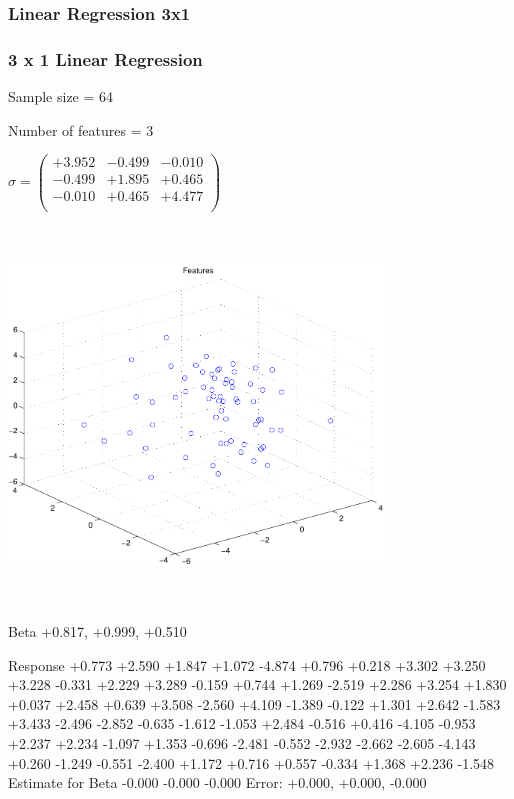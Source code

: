 \documentclass[9pt]{article}
\theoremstyle{plain}
\theoremstyle{definition}
\theoremstyle{remark}
\numberwithin{equation}{section}
\begin{document}
\subsubsection{Linear Regression 3x1}
\subsubsection{3 x 1 Linear Regression}
Sample size = 64

Number of features = 3

$\sigma = \left(
\begin{array}{
ccc}
+3.952 & -0.499 & -0.010 \\
-0.499 & +1.895 & +0.465 \\
-0.010 & +0.465 & +4.477 \\
\end{array}
\right)$ \newline 

\includegraphics[width=10.0cm,height=10.0cm]{regression_features.pdf}

Beta
+0.817, +0.999, +0.510

Response
+0.773
+2.590
+1.847
+1.072
-4.874
+0.796
+0.218
+3.302
+3.250
+3.228
-0.331
+2.229
+3.289
-0.159
+0.744
+1.269
-2.519
+2.286
+3.254
+1.830
+0.037
+2.458
+0.639
+3.508
-2.560
+4.109
-1.389
-0.122
+1.301
+2.642
-1.583
+3.433
-2.496
-2.852
-0.635
-1.612
-1.053
+2.484
-0.516
+0.416
-4.105
-0.953
+2.237
+2.234
-1.097
+1.353
-0.696
-2.481
-0.552
-2.932
-2.662
-2.605
-4.143
+0.260
-1.249
-0.551
-2.400
+1.172
+0.716
+0.557
-0.334
+1.368
+2.236
-1.548
Estimate for Beta
-0.000
-0.000
-0.000
Error:
+0.000, +0.000, -0.000
\end{document}
